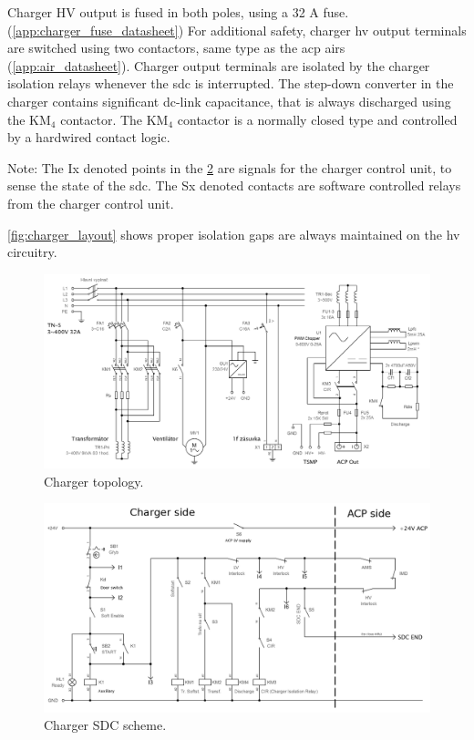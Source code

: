 Charger HV output is fused in both poles, using a 32 A fuse. (\ref{app:charger_fuse_datasheet}) For additional safety, charger \gls{hv} output terminals are switched using two contactors, same type as the \gls{acp} \glspl{air} (\ref{app:air_datasheet}). Charger output terminals are isolated by the charger isolation relays whenever the \gls{sdc} is interrupted. The step-down converter in the charger contains significant dc-link capacitance, that is always discharged using the KM$_4$ contactor. The KM$_4$ contactor is a normally closed type and controlled by a hardwired contact logic.

Note: The Ix denoted points in the \ref{fig:charger_sdc_scheme} are signals for the charger control unit, to sense the state of the \gls{sdc}. The Sx denoted contacts are software controlled relays from the charger control unit.

\ref{fig:charger_layout} shows proper isolation gaps are always maintained on the \gls{hv} circuitry.


\begin{figure}[H]
	\centering
	\includegraphics[width=\textwidth]{./img/charger_topology.png}
	\caption{Charger topology.}
	\label{fig:charger_topology}
\end{figure}

\begin{figure}[H]
	\centering
	\includegraphics[width=\textwidth]{./img/charger_sdc_schematic.png}
	\caption{Charger SDC scheme.}
	\label{fig:charger_sdc_scheme}
\end{figure}

